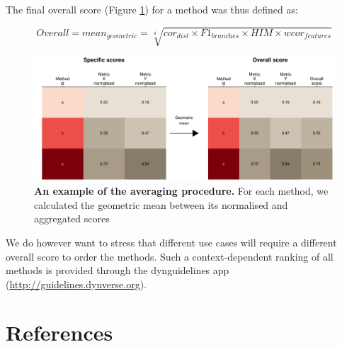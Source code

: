 The final overall score (Figure \ref{fig:snote1fig_14}) for a method was thus defined as: 

$$\textit{Overall} = \textit{mean}_{\textit{geometric}} = \sqrt[4]{\textit{cor}_{\textit{dist}} \times \textit{F1}_{\textit{branches}} \times \textit{HIM} \times \textit{wcor}_{\textit{features}}}$$

\begin{figure}[tbh!]
	\centering\includegraphics[width=0.8\linewidth]{fig/snote1fig_14.pdf}
	\caption{
		\textbf{An example of the averaging procedure.} 
		For each method, we calculated the geometric mean between its normalised and aggregated scores
	}
	\label{fig:snote1fig_14}
\end{figure}

We do however want to stress that different use cases will require a different overall score to order the methods. Such a context-dependent ranking of all methods is provided through the dynguidelines app (\href{http://guidelines.dynverse.org}{http://guidelines.dynverse.org}).



\clearpage
\section{References}
\printbibliography[heading=none]